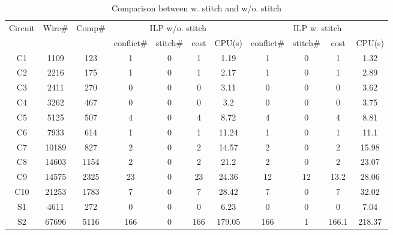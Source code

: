 \documentclass[12pt]{spieman}
\theoremstyle{plain}
\begin{document}
\begin{spacing}{1}
\begin{table*}[htb]
{\begin{tabular}{|c|c|c |c|c|c|c||c|c|c|c||}
 \hline \hline
\end{tabular}
}
\end{table*}
\fi

\begin{table*}[htb]
\centering
\renewcommand{\arraystretch}{0.9}
\caption{Comparison between w. stitch and w/o. stitch}
\label{tab:tplec_stitch}
\resizebox{16.4cm}{!} {
\begin{tabular}{|c|c|c |c|c|c|c||c|c|c|c||}
  \hline \hline
  \multirow{2}{*}{Circuit} &\multirow{2}{*}{Wire\#}  &\multirow{2}{*}{Comp\#} &\multicolumn{4}{c||}{ILP w/o. stitch} & \multicolumn{4}{c|}{ILP w. stitch}\\
  \cline{4-11} &        &         &conflict\# &stitch\#  & cost & CPU(s)        &conflict\#    &stitch\#      &cost  & CPU(s) \\
  \hline
 C1           &1109    &123        &1     &0    &1       &1.19       &1       &0     &1       &1.32   \\ 
 C2           &2216    &175        &1     &0    &1       &2.17       &1       &0     &1       &2.89   \\  
 C3           &2411    &270        &0     &0    &0       &3.11       &0       &0     &0       &3.62   \\  
 C4           &3262    &467        &0     &0    &0       &3.2        &0       &0     &0       &3.75   \\   
 C5           &5125    &507        &4     &0    &4       &8.72       &4       &0     &4       &8.81   \\  
 C6           &7933    &614        &1     &0    &1       &11.24      &1       &0     &1       &11.1   \\ 
 C7           &10189   &827        &2     &0    &2       &14.57      &2       &0     &2       &15.98  \\   
 C8           &14603   &1154       &2     &0    &2       &21.2       &2       &0     &2       &23.07  \\  
 C9           &14575   &2325       &23    &0    &23      &24.36      &12      &12    &13.2    &28.06  \\   
 C10          &21253   &1783       &7     &0    &7       &28.42      &7       &0     &7       &32.02  \\    
 S1           &4611    &272        &0     &0    &0       &6.23       &0       &0     &0       &7.04   \\   
 S2           &67696   &5116       &166   &0    &166     &179.05     &166     &1     &166.1   &218.37 \\    

\end{tabular}}
\end{table*}
\end{spacing}
\end{document}
